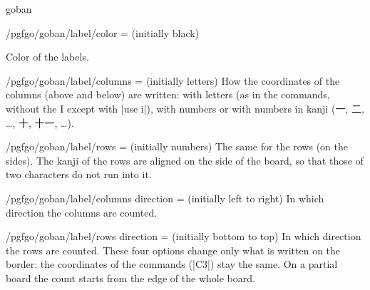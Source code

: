 \begin{environment}{{goban}}
	\begin{key}{/pgfgo/goban/label/color =  (initially black)}

		Color of the labels.

		\begin{codeexample}[]
			\begin{goban}[5, label = {at = {south, west}, color = red, sep = 0.6cm}]
			\end{goban}
		\end{codeexample}
	\end{key}

	\begin{key}{/pgfgo/goban/label/columns =  (initially letters)}
		How the coordinates of the columns (above and below) are written: with letters (as in the commands, without the I except with |use i|), with numbers or with numbers in kanji ({\pgfgokanji 一, 二, …, 十, 十一}, …).
	\end{key}

	\begin{key}{/pgfgo/goban/label/rows =  (initially numbers)}
		The same for the rows (on the sides). The kanji of the rows are aligned on the side of the board, so that those of two characters do not run into it.
	\end{key}

	\begin{key}{/pgfgo/goban/label/columns direction =  (initially left to right)}
		In which direction the columns are counted.

		\begin{codeexample}[]
			\begin{goban}[5, label = {at = {north, east},
					columns direction = right to left, rows = letters}]
			\end{goban}
		\end{codeexample}
	\end{key}

	\begin{key}{/pgfgo/goban/label/rows direction =  (initially bottom to top)}
		In which direction the rows are counted. These four options change only what is written on the border: the coordinates of the commands (|C3|) stay the same. On a partial board the count starts from the edge of the whole board.

		\begin{codeexample}[]
			\begin{goban}[5, label = {at = {north, west}, columns = numbers,
				rows direction = top to bottom}]
			\end{goban}
		\end{codeexample}
	\end{key}


\end{environment}
